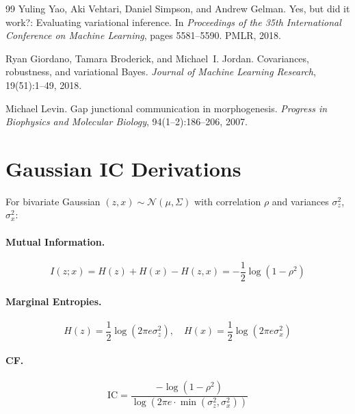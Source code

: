 \documentclass[10pt]{article} %
\theoremstyle{plain}
\theoremstyle{definition}
\newcommand{\IC}{\mathrm{IC}}  %
\newcommand{\MI}{I}
\newcommand{\Ent}{H}
\begin{document}
\begin{thebibliography}{99}
Yuling Yao, Aki Vehtari, Daniel Simpson, and Andrew Gelman.
\newblock Yes, but did it work?: Evaluating variational inference.
\newblock In \emph{Proceedings of the 35th International Conference on Machine Learning}, pages 5581--5590. PMLR, 2018.

Ryan Giordano, Tamara Broderick, and Michael~I. Jordan.
\newblock Covariances, robustness, and variational {B}ayes.
\newblock \emph{Journal of Machine Learning Research}, 19(51):1--49, 2018.

Michael Levin.
\newblock Gap junctional communication in morphogenesis.
\newblock \emph{Progress in Biophysics and Molecular Biology}, 94(1--2):186--206, 2007.

\end{thebibliography}
\appendix

\section{Gaussian IC Derivations}
\label{app:gaussian}

For bivariate Gaussian $(z, x) \sim \mathcal{N}(\mu, \Sigma)$ with correlation $\rho$ and variances $\sigma_z^2$, $\sigma_x^2$:

\paragraph{Mutual Information.}
\begin{equation}
\MI(z;x) = \Ent(z) + \Ent(x) - \Ent(z,x) = -\frac{1}{2}\log(1 - \rho^2)
\end{equation}

\paragraph{Marginal Entropies.}
\begin{equation}
\Ent(z) = \frac{1}{2}\log(2\pi e \sigma_z^2), \quad \Ent(x) = \frac{1}{2}\log(2\pi e \sigma_x^2)
\end{equation}

\paragraph{CF.}
\begin{equation}
\IC = \frac{-\log(1-\rho^2)}{\log(2\pi e \cdot \min(\sigma_z^2, \sigma_x^2))}
\end{equation}
\end{document}
